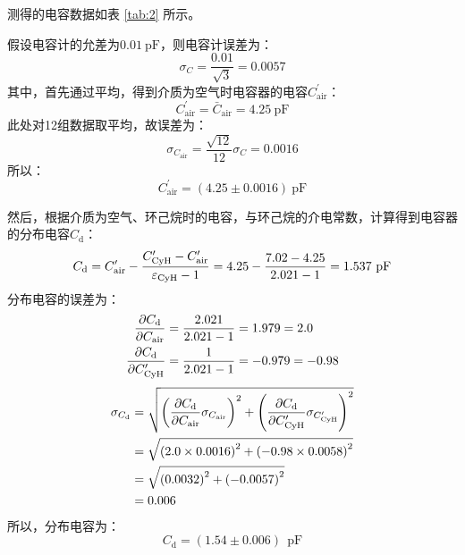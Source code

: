 \documentclass[cn,hazy,pku,12pt,normal,math=newtx,cite=super]{elegantnote}
\begin{document}
测得的电容数据如表 \ref{tab:2} 所示。

假设电容计的允差为$0.01\mathrm{~pF}$，则电容计误差为：
\begin{equation*}
    \sigma_{C} = \frac{0.01}{\sqrt{3}} = 0.0057
\end{equation*}
其中，首先通过平均，得到介质为空气时电容器的电容$C_{\text{air}}^\prime$：
\begin{equation*}
    C_{\text{air}}^\prime = \bar{C}_{\text{air}}= 4.25 \mathrm{~pF}
\end{equation*}
此处对12组数据取平均，故误差为：
\begin{equation*}
    \sigma_{C_{\text{air}}} = \frac{\sqrt{12}}{12}\sigma_{C} = 0.0016
\end{equation*}
所以：
\begin{equation*}
    C_{\text{air}}^\prime = (4.25\pm 0.0016) \mathrm{~pF}
\end{equation*}

然后，根据介质为空气、环己烷时的电容，与环己烷的介电常数，计算得到电容器的分布电容$C_{\text{d}}$：
\begin{equation}\label{eq:9}
    C_{\text{d}} = C_{\text{air}}^\prime - \frac{C_{\ce{CyH}}^\prime-C_{\text{air}}^\prime}{\varepsilon_{\ce{CyH}}-1} = 4.25 -\frac{7.02-4.25}{2.021-1} = 1.537\mathrm{~pF} 
\end{equation}
分布电容的误差为：
\begin{equation*}
\begin{aligned}
\frac{\partial C_{\text{d}} }{\partial C_{\text{air}} }&=\frac{2.021}{2.021-1}=1.979=2.0\\
\frac{\partial C_{\text{d}} }{\partial C_{\ce{CyH}}^\prime }&=\frac{1}{2.021-1}=-0.979=-0.98\\
\end{aligned}
\end{equation*}
\begin{equation}\label{eq:10}
\begin{aligned}
\sigma_{C_{\text{d}}}&=\sqrt{\left(\frac{\partial C_{\text{d}} }{\partial C_{\text{air}} } \sigma_{C_{\text{air}}}\right)^2+\left(\frac{\partial C_{\text{d}} }{\partial C_{\ce{CyH}}^\prime } \sigma_{C_{\ce{CyH}}^\prime}\right)^2}\\
&=\sqrt{\left(2.0 \times 0.0016\right)^2+\left(-0.98 \times 0.0058\right)^2}\\
&=\sqrt{\left(0.0032\right)^2+\left(-0.0057\right)^2}\\       
&=0.006\  
\end{aligned}
\end{equation}
所以，分布电容为：
\begin{equation*}
C_{\text{d}}=\left (1.54 \pm 0.006 \right )\ \mathrm{~pF} 
\end{equation*}
\end{document}
